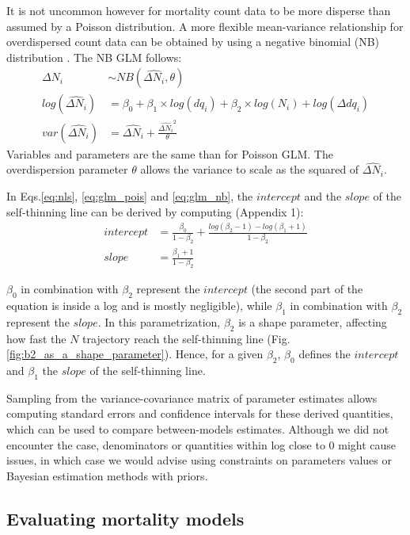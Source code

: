\documentclass[12pt,english]{article}
\begin{document}
It is not uncommon however for mortality count data to be more disperse than assumed by a Poisson distribution. A more flexible mean-variance relationship for overdispersed count data can be obtained by using a negative binomial (NB) distribution \citep{Affleck2006}. The NB GLM follows:
\begin{align}
  \label{eq:glm_nb}
    \Delta N_i &\sim NB(\widehat{\Delta N_i}, \theta)\\
    log(\widehat{\Delta N_i}) &= \beta_0 + \beta_1 \times log(dq_i) + \beta_2 \times log(N_i) + log(\Delta dq_i) \nonumber \\
    var(\widehat{\Delta N_i}) &= \widehat{\Delta N_i} + \frac{\widehat{\Delta N_i}^2} {\theta} \nonumber       
\end{align}
Variables and parameters are the same than for Poisson GLM. The overdispersion parameter $\theta$ allows the variance to scale as the squared of $\widehat{\Delta N_i}$.

\bigskip 
In Eqs.\ref{eq:nls}, \ref{eq:glm_pois} and \ref{eq:glm_nb}, the $intercept$ and the $slope$ of the self-thinning line can be derived by computing (Appendix 1):
\begin{align}
  \label{eq:intercept}
    intercept &= \frac{\beta_0}{1-\beta_2} + \frac{log(\beta_2-1)-log(\beta_1+1)}{1-\beta_2} \\
  \label{eq:slope}   
    slope &= \frac{\beta_1 + 1}{1-\beta_2}
\end{align} 

$\beta_0$ in combination with $\beta_2$ represent the $intercept$ (the second part of the equation is inside a log and is mostly negligible), while $\beta_1$ in combination with $\beta_2$ represent the $slope$. In this parametrization, $\beta_2$ is a shape parameter, affecting how fast the $N$ trajectory reach the self-thinning line (Fig.\ref{fig:b2_as_a_shape_parameter}). Hence, for a given $\beta_2$, $\beta_0$ defines the $intercept$ and $\beta_1$ the $slope$ of the self-thinning line.

Sampling from the variance-covariance matrix of parameter estimates allows computing standard errors and confidence intervals for these derived quantities, which can be used to compare between-models estimates. Although we did not encounter the case, denominators or quantities within log close to 0 might cause issues, in which case we would advise using constraints on parameters values or Bayesian estimation methods with priors.


\subsection{Evaluating mortality models}
\end{document}
